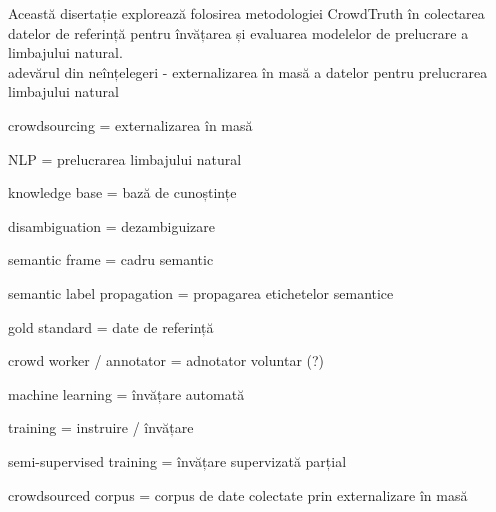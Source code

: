 Această disertație explorează folosirea metodologiei CrowdTruth în colectarea datelor de referință pentru învățarea și evaluarea modelelor de prelucrare a limbajului natural. \\

adevărul din neînțelegeri  - externalizarea în masă a datelor pentru prelucrarea limbajului natural

crowdsourcing = externalizarea în masă %

NLP = prelucrarea limbajului natural

knowledge base = bază de cunoștințe

disambiguation = dezambiguizare

semantic frame = cadru semantic %

semantic label propagation = propagarea etichetelor semantice

gold standard = date de referință

crowd worker / annotator = adnotator voluntar (?)

machine learning = învățare automată

training = instruire / învățare

semi-supervised training = învățare supervizată parțial

crowdsourced corpus = corpus de date colectate prin externalizare în masă

